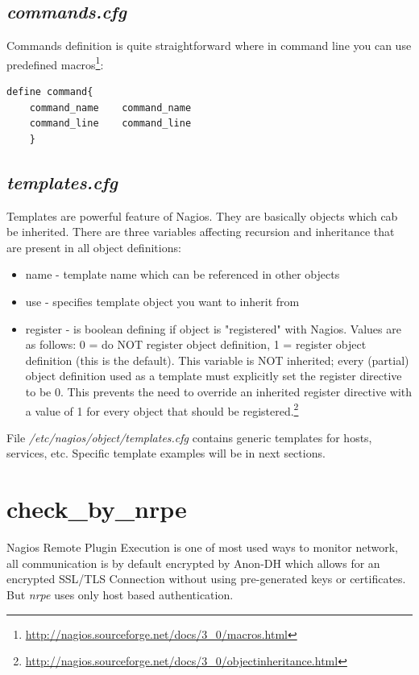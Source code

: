 \documentclass[10pt,a4paper,final]{report}
\begin{document}
\subsection{\emph{commands.cfg}}
Commands definition is quite straightforward where in command line you can use predefined macros\footnote{\url{http://nagios.sourceforge.net/docs/3\_0/macros.html}}:
\begin{lstlisting}
define command{
	command_name	command_name
	command_line	command_line
   	}
\end{lstlisting}

\subsection{\emph{templates.cfg}}
Templates are powerful feature of Nagios. They are basically objects which cab be inherited. There are three variables affecting recursion and inheritance that are present in all object definitions:
\begin{itemize}
\item name - template name which can be referenced in other objects
\item use - specifies template object you want to inherit from
\item register - is boolean defining if object is "registered" with Nagios. Values are as follows: 0 = do NOT register object definition, 1 = register object definition (this is the default). This variable is NOT inherited; every (partial) object definition used as a template must explicitly set the register directive to be 0. This prevents the need to override an inherited register directive with a value of 1 for every object that should be registered.\footnote{\url{http://nagios.sourceforge.net/docs/3_0/objectinheritance.html}}
\end{itemize}
File \emph{/etc/nagios/object/templates.cfg} contains generic templates for hosts, services, etc. Specific template examples will be in next sections.

\section{check\_by\_nrpe}
Nagios Remote Plugin Execution is one of most used ways to monitor network, all communication is by default encrypted by Anon-DH which allows for an encrypted SSL/TLS Connection without using pre-generated keys or certificates. But \emph{nrpe} uses only host based authentication.
\end{document}

